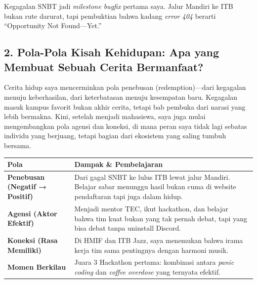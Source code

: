 \documentclass[
  letterpaper,
  DIV=11,
  numbers=noendperiod]{scrreprt}
\begin{document}
Kegagalan SNBT jadi \emph{milestone bugfix} pertama saya. Jalur Mandiri
ke ITB bukan rute darurat, tapi pembuktian bahwa kadang \emph{error 404}
berarti ``Opportunity Not Found---Yet.''

\subsection{\texorpdfstring{\textbf{2. Pola-Pola Kisah Kehidupan: Apa
yang Membuat Sebuah Cerita
Bermanfaat?}}{2. Pola-Pola Kisah Kehidupan: Apa yang Membuat Sebuah Cerita Bermanfaat?}}\label{pola-pola-kisah-kehidupan-apa-yang-membuat-sebuah-cerita-bermanfaat}

Cerita hidup saya mencerminkan pola penebusan (redemption)---dari
kegagalan menuju keberhasilan, dari keterbatasan menuju kesempatan baru.
Kegagalan masuk kampus favorit bukan akhir cerita, tetapi bab pembuka
dari narasi yang lebih bermakna. Kini, setelah menjadi mahasiswa, saya
juga mulai mengembangkan pola agensi dan koneksi, di mana peran saya
tidak lagi sebatas individu yang berjuang, tetapi bagian dari ekosistem
yang saling tumbuh bersama.

\begin{longtable}[]{@{}
  >{\raggedright\arraybackslash}p{}
  >{\raggedright\arraybackslash}p{}@{}}
\toprule\noalign{}
\begin{minipage}[b]{\linewidth}\raggedright
Pola
\end{minipage} & \begin{minipage}[b]{\linewidth}\raggedright
Dampak \& Pembelajaran
\end{minipage} \\
\midrule\noalign{}
\endhead
\bottomrule\noalign{}
\endlastfoot
\textbf{Penebusan (Negatif → Positif)} & Dari gagal SNBT ke lulus ITB
lewat jalur Mandiri. Belajar sabar menunggu hasil bukan cuma di website
pendaftaran tapi juga dalam hidup. \\
\textbf{Agensi (Aktor Efektif)} & Menjadi mentor TEC, ikut hackathon,
dan belajar bahwa tim kuat bukan yang tak pernah debat, tapi yang bisa
debat tanpa uninstall Discord. \\
\textbf{Koneksi (Rasa Memiliki)} & Di HMIF dan ITB Jazz, saya menemukan
bahwa irama kerja tim sama pentingnya dengan harmoni musik. \\
\textbf{Momen Berkilau} & Juara 3 Hackathon pertama: kombinasi antara
\emph{panic coding} dan \emph{coffee overdose} yang ternyata efektif. \\
\end{longtable}
\end{document}
